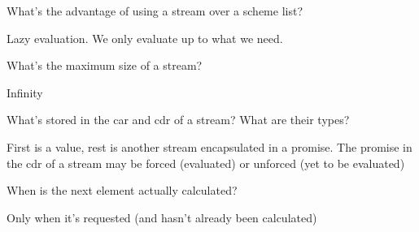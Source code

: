 \begin{blocksection}
\question What's the advantage of using a stream over a scheme list?
\begin{solution}[0.5in] 
Lazy evaluation. We only evaluate up to what we need.
\end{solution}

\question What's the maximum size of a stream?
\begin{solution}[0.5in]
Infinity
\end{solution}

\question What's stored in the car and cdr of a stream? What are their types? 
\begin{solution}[0.5in]
First is a value, rest is another stream encapsulated in a promise. The promise in the cdr of a stream may be forced (evaluated) or unforced (yet to be evaluated)
\end{solution}

\question When is the next element actually calculated?
\begin{solution}[.5in]
Only when it's requested (and hasn't already been calculated)
\end{solution}
\end{blocksection}